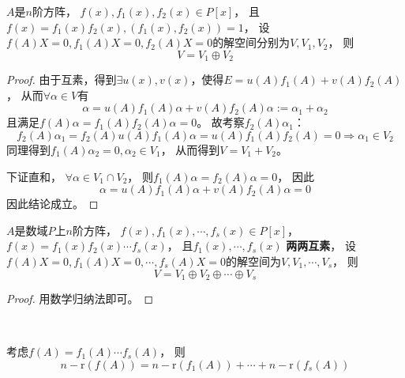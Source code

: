 \begin{theorem}[解空间分解]
  $A$是$n$阶方阵，
  $f(x),f_1(x),f_2(x) \in P[x]$，
  且$f(x) = f_1(x)f_2(x), (f_1(x),f_2(x)) = 1$，
  设$f(A)X = 0, f_1(A)X = 0, f_2(A)X = 0$的解空间分别为$V,V_1,V_2$，
  则
  \begin{equation*}
    V = V_1 \oplus V_2
  \end{equation*}
\end{theorem}

\begin{proof}
  由于互素，得到$\exists u(x),v(x)$，使得$E = u(A)f_1(A) + v(A) f_2(A)$，
  从而$\forall \alpha \in V$有
  \begin{equation*}
    \alpha = u(A)f_1(A)\alpha + v(A) f_2(A)\alpha := \alpha_1 + \alpha_2
  \end{equation*}
  且满足$f(A)\alpha = f_1(A)f_2(A)\alpha = 0$。
  故考察$f_2(A)\alpha_1$：
  \begin{equation*}
    f_2(A)\alpha_1 = f_2(A) u(A)f_1(A)\alpha = u(A)f_1(A)f_2(A) = 0 \Rightarrow \alpha_1 \in V_2
  \end{equation*}
  同理得到$f_1(A)\alpha_2 = 0, \alpha_2 \in V_1$，
  从而得到$V = V_1 + V_2$。

  下证直和，
  $\forall \alpha \in V_1 \cap V_2$，
  则$f_1(A)\alpha = f_2(A) \alpha = 0$，
  因此
  \begin{equation*}
    \alpha = u(A)f_1(A) \alpha + v(A)f_2(A)\alpha = 0
  \end{equation*}
  因此结论成立。
\end{proof}

\begin{theorem}[多空间分解]
  $A$是数域$P$上$n$阶方阵，
  $f(x),f_1(x),\cdots, f_s(x) \in P[x]$，
  $f(x) = f_1(x)f_2(x)\cdots f_s(x)$，
  且$f_1(x),\cdots,f_s(x)$ \textbf{两两互素}，
  设$f(A)X = 0, f_1(A)X = 0,\cdots,f_s(A)X = 0$的解空间为$V,V_1,\cdots,V_s$，
  则
  \begin{equation*}
    V = V_1 \oplus V_2 \oplus \cdots \oplus V_s
  \end{equation*}
\end{theorem}

\begin{proof}
  用数学归纳法即可。
\end{proof}

~

\begin{theorem}[空间分解研究矩阵秩]
  考虑$f(A) = f_1(A)\cdots f_s(A)$，
  则
  \begin{equation*}
    n - \mathrm{r}(f(A)) = n - \mathrm{r}(f_1(A)) + \cdots + n - \mathrm{r}(f_s(A))
  \end{equation*}
\end{theorem}


